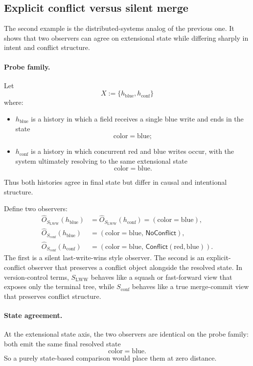 \documentclass[11pt,twoside]{article}
\theoremstyle{definition}
\begin{document}
\subsection{Explicit conflict versus silent merge}
\label{subsec:explicit-conflict-vs-silent-merge}

The second example is the distributed-systems analog of the previous one. It shows that two observers can agree on extensional state while differing sharply in intent and conflict structure.

\paragraph{Probe family.}
Let
\[
  X := \{ h_{\mathrm{blue}}, h_{\mathrm{conf}} \}
\]
where:
\begin{itemize}[leftmargin=*]
  \item \(h_{\mathrm{blue}}\) is a history in which a field receives a single blue write and ends in the state
        \[
          \mathrm{color}=\mathrm{blue};
        \]
  \item \(h_{\mathrm{conf}}\) is a history in which concurrent red and blue writes occur, with the system ultimately resolving to the same extensional state
        \[
          \mathrm{color}=\mathrm{blue}.
        \]
\end{itemize}
Thus both histories agree in final state but differ in causal and intentional structure.

Define two observers:
\begin{align*}
  \widehat{O}_{S_{\mathrm{LWW}}}(h_{\mathrm{blue}})
  &=
  \widehat{O}_{S_{\mathrm{LWW}}}(h_{\mathrm{conf}})
  =
  (\mathrm{color}=\mathrm{blue}), \\
  \widehat{O}_{S_{\mathrm{conf}}}(h_{\mathrm{blue}})
  &=
  (\mathrm{color}=\mathrm{blue},\,\mathsf{NoConflict}), \\
  \widehat{O}_{S_{\mathrm{conf}}}(h_{\mathrm{conf}})
  &=
  (\mathrm{color}=\mathrm{blue},\,\mathsf{Conflict}(\mathrm{red},\mathrm{blue})).
\end{align*}
The first is a silent last-write-wins style observer. The second is an explicit-conflict observer that preserves a conflict object alongside the resolved state.
In version-control terms, \(S_{\mathrm{LWW}}\) behaves like a squash or fast-forward view that exposes only the terminal tree, while \(S_{\mathrm{conf}}\) behaves like a true merge-commit view that preserves conflict structure.

\paragraph{State agreement.}
At the extensional state axis, the two observers are identical on the probe family: both emit the same final resolved state
\[
  \mathrm{color}=\mathrm{blue}.
\]
So a purely state-based comparison would place them at zero distance.
\end{document}
